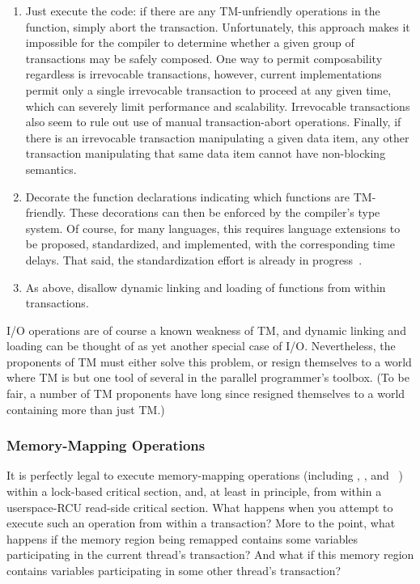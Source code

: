 \begin{enumerate}
\item	Just execute the code: if there are any TM-unfriendly operations
	in the function, simply abort the transaction.
	Unfortunately, this approach makes it impossible for the compiler
	to determine whether a given group of transactions may be safely
	composed.
	One way to permit composability regardless is irrevocable
	transactions, however, current implementations permit only a
	single irrevocable transaction to proceed at any given time,
	which can severely limit performance and scalability.
	Irrevocable transactions also seem to rule out use of manual
	transaction-abort operations.
	Finally, if there is an irrevocable transaction manipulating
	a given data item, any other transaction manipulating that
	same data item cannot have non-blocking semantics.
\item	Decorate the function declarations indicating which functions
	are TM-friendly.
	These decorations can then be enforced by the compiler's type system.
	Of course, for many languages, this requires language extensions
	to be proposed, standardized, and implemented, with the
	corresponding time delays.
	That said, the standardization effort is already in
	progress~\cite{Ali-Reza-Adl-Tabatabai2009CppTM}.
\item	As above, disallow dynamic linking and loading of functions from
	within transactions.
\end{enumerate}

I/O operations are of course a known weakness of TM, and dynamic linking
and loading can be thought of as yet another special case of I/O.
Nevertheless, the proponents of TM must either solve this problem, or
resign themselves to a world where TM is but one tool of several in the
parallel programmer's toolbox.
(To be fair, a number of TM proponents have long since resigned themselves
to a world containing more than just TM.)

\subsubsection{Memory-Mapping Operations}
\label{sec:future:Memory-Mapping Operations}

It is perfectly legal to execute memory-mapping operations (including
, , and ~\cite{TheOpenGroup1997SUS})
within a lock-based critical section, and, at least in principle, from
within a userspace-RCU read-side critical section.
What happens when you attempt to execute such an operation from within
a transaction?
More to the point, what happens if the memory region being remapped
contains some variables participating in the current thread's transaction?
And what if this memory region contains variables participating in some
other thread's transaction?

